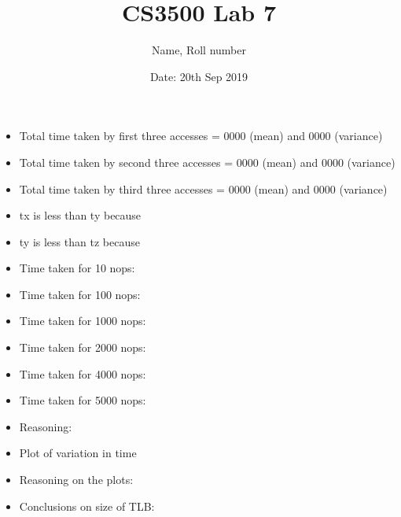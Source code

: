 \documentclass[addpoints,11pt,a4paper]{exam}
\title{CS3500 Lab 7}
\author{Name, Roll number}
\date{Date: 20th Sep 2019}
\begin{document}
\lstset{basicstyle=\footnotesize\ttfamily,breaklines=true}
\lstset{framextopmargin=45pt,frame=bottomline}

\maketitle
\begin{questions}

\question 
\begin{itemize}
	\item Total time taken by first three accesses = 0000 (mean) and 0000 (variance)
	\item Total time taken by second three accesses = 0000 (mean) and 0000 (variance)
	\item Total time taken by third three accesses = 0000 (mean) and 0000 (variance)
	\item tx is less than ty because
	\item ty is less than tz because
\end{itemize}

\question 
\begin{itemize}
	\item Time taken for 10 nops: 
	\item Time taken for 100 nops:
	\item Time taken for 1000 nops: 
	\item Time taken for 2000 nops:
	\item Time taken for 4000 nops:
	\item Time taken for 5000 nops:
	\item Reasoning: 
\end{itemize}

\question 
\begin{itemize}
	\item Plot of variation in time
	\loadedtable
	\begin{figure}[h!]
  	\end{figure}
  	\item Reasoning on the plots: 
  	\item Conclusions on size of TLB: 
\end{itemize}


\end{questions}
\end{document}
